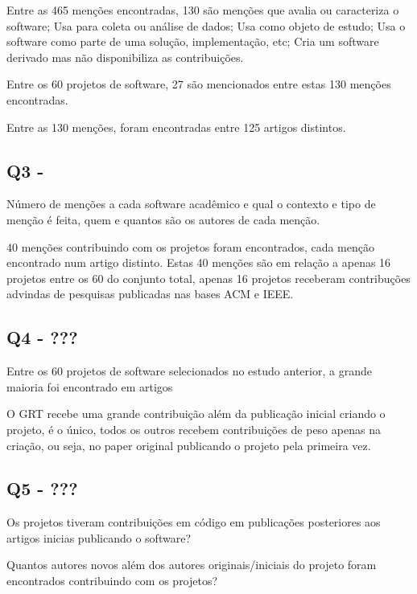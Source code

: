 Entre as 465 menções encontradas, 130 são menções que avalia ou caracteriza o
software; Usa para coleta ou análise de dados; Usa como objeto de estudo; Usa o
software como parte de uma solução, implementação, etc; Cria um software
derivado mas não disponibiliza as contribuições.

Entre os 60 projetos de software, 27 são mencionados entre estas 130 menções
encontradas.


Entre as 130 menções, foram encontradas entre 125 artigos distintos.

\subsection{Q3 - \EstudoDoisQuestaoTres}

Número de menções a cada software acadêmico e qual o contexto e tipo de menção
é feita, quem e quantos são os autores de cada menção.


40 menções contribuindo com os projetos foram encontrados, cada menção
encontrado num artigo distinto. Estas 40 menções são em relação a apenas
16 projetos entre os 60 do conjunto total, apenas 16 projetos receberam
contribuções advindas de pesquisas publicadas nas bases ACM e IEEE.

\subsection{Q4 - ???}

Entre os 60 projetos de software selecionados no estudo anterior, a grande maioria
foi encontrado em artigos 

O GRT recebe uma grande contribuição além da publicação inicial criando o projeto,
é o único, todos os outros recebem contribuições de peso apenas na criação, ou seja,
no paper original publicando o projeto pela primeira vez.

\subsection{Q5 - ???}

Os projetos tiveram contribuições em código em publicações posteriores aos
artigos inicias publicando o software?

Quantos autores novos além dos autores originais/iniciais do projeto
foram encontrados contribuindo com os projetos?

